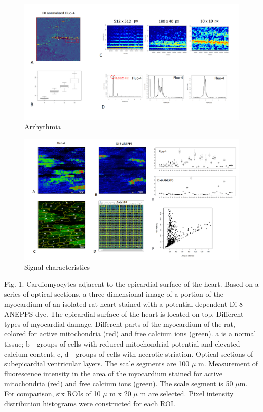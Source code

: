 \documentclass[a4paper,12pt]{article}
\begin{document}
\begin{figure}
    \includegraphics[width=\linewidth]{fig3.png}
    \caption{Arrhythmia}
    \label{fig:fig3}
\end{figure}

\begin{figure}
    \includegraphics[width=\linewidth]{fig4.png}
    \caption{Signal characteristics}
    \label{fig:fig4}
\end{figure}

Fig. 1. Cardiomyocytes adjacent to the epicardial surface of the heart. Based on a series of optical sections, a three-dimensional image of a portion of the myocardium of an isolated rat heart stained with a potential dependent Di-8-ANEPPS dye. The epicardial surface of the heart is located on top. Different types of myocardial damage. Different parts of the myocardium of the rat, colored for active mitochondria (red) and free calcium ions (green). a is a normal tissue; b - groups of cells with reduced mitochondrial potential and elevated calcium content; c, d - groups of cells with necrotic striation. Optical sections of subepicardial ventricular layers. The scale segments are 100 $\mu$ m. Measurement of fluorescence intensity in the area of the myocardium stained for active mitochondria (red) and free calcium ions (green). The scale segment is 50 $\mu$m. For comparison, six ROIs of 10 $\mu$ m x 20 $\mu$ m are selected. Pixel intensity distribution histograms were constructed for each ROI.
\end{document}
